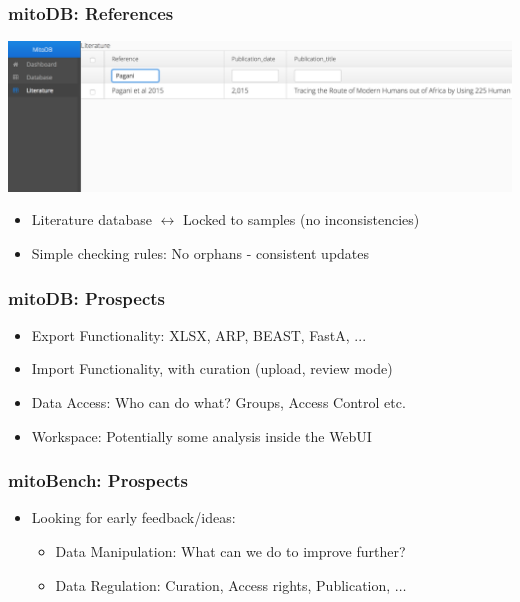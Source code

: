 \documentclass{beamer} %
\begin{document}
\begin{frame}
\frametitle{mitoDB: References}
\centering
	\includegraphics[scale=0.25]{imagesDB/mitodb_references.png}
\begin{itemize}
\item Literature database $\leftrightarrow$ Locked to samples (no inconsistencies)
\item Simple checking rules: No orphans - consistent updates 
\end{itemize}
\end{frame}

\begin{frame}
\frametitle{mitoDB: Prospects}
\centering
\begin{itemize}
\item Export Functionality: XLSX, ARP, BEAST, FastA, ... \pause
\item Import Functionality, with curation (upload, review mode) \pause
\item Data Access: Who can do what? Groups, Access Control etc. \pause
\item Workspace: Potentially some analysis inside the WebUI
\end{itemize}
\end{frame}



\begin{frame}
\frametitle{mitoBench: Prospects}
\begin{itemize}
\item Looking for early feedback/ideas:
\begin{itemize}
\item Data Manipulation: What can we do to improve further? 
\item Data Regulation: Curation, Access rights, Publication, $\ldots$
\end{itemize}
\end{itemize}
\end{frame}
\end{document}
